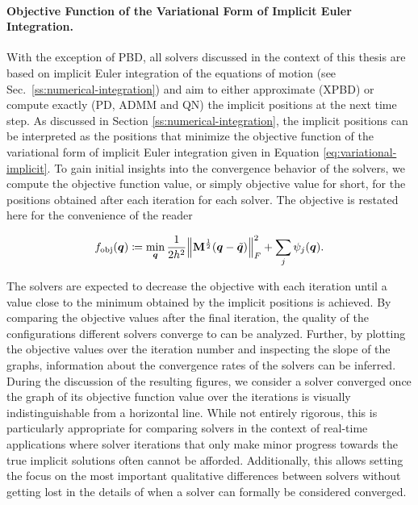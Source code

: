 \paragraph{Objective Function of the Variational Form of Implicit Euler Integration.}
With the exception of PBD, all solvers discussed in the context of this thesis are based on implicit Euler integration of the equations of 
motion (see Sec.\ \ref{ss:numerical-integration}) and aim to either approximate (XPBD) or compute exactly (PD, ADMM and QN) the implicit positions at the next time step. 
As discussed in Section \ref{ss:numerical-integration}, the implicit positions can be interpreted as the positions that minimize the objective function of the variational 
form of implicit Euler integration given in Equation \ref{eq:variational-implicit}. To gain initial insights into the convergence behavior of the solvers, we compute 
the objective function value, or simply objective value for short, for the positions obtained after each iteration for each solver. The objective is restated here 
for the convenience of the reader

\begin{equation}\label{eq:variational-implicit-copy}
    f_{\text{obj}}(\bm{q}) \coloneqq \min_{\bm{q}} \frac{1}{2h^2} \norm{\mathbf{M}^{\frac{1}{2}}(\bm{q} - \tilde{\bm{q}})}^2_F + \sum_j \psi_j(\bm{q}).
\end{equation}

\noindent The solvers are expected to decrease the objective with each iteration until a value close to the minimum obtained 
by the implicit positions is achieved. By comparing the objective values after the final iteration, the quality of the configurations different
solvers converge to can be analyzed. Further, by plotting the objective values over the iteration number and inspecting the slope of the graphs, information about
the convergence rates of the solvers can be inferred. During the discussion of the resulting figures, we consider a solver converged once the graph of its objective function 
value over the iterations is visually indistinguishable from a horizontal line. While not entirely rigorous, this is particularly appropriate for comparing solvers in the 
context of real-time applications where solver iterations that only make minor progress towards the true implicit solutions often cannot be afforded. Additionally, this 
allows setting the focus on the most important qualitative differences between solvers without getting lost in the details of when a solver can formally be considered converged.

